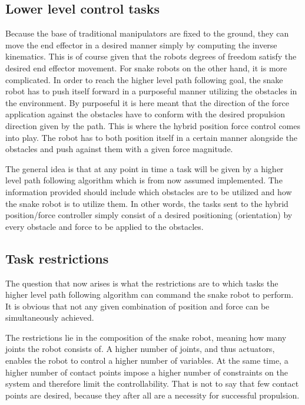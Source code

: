 \subsection{Lower level control tasks}

Because the base of traditional manipulators are fixed to the ground, they can move the end effector in a desired manner simply by computing the inverse kinematics. This is of course given that the robots degrees of freedom satisfy the desired end effector movement. For snake robots on the other hand, it is more complicated.
In order to reach the higher level path following goal, the snake robot has to push itself forward in a purposeful manner utilizing the obstacles in the environment. By purposeful it is here meant that the direction of the force application against the obstacles have to conform with the desired propulsion direction given by the path. This is where the hybrid position force control comes into play. The robot has to both position itself in a certain manner alongside the obstacles and push against them with a given force magnitude.

The general idea is that at any point in time a task will be given by a higher level path following algorithm which is from now assumed implemented. The information provided should include which obstacles are to be utilized and how the snake robot is to utilize them. In other words, the tasks sent to the hybrid position/force controller simply consist of a desired positioning (orientation) by every obstacle and force to be applied to the obstacles.



\subsection{Task restrictions}\label{subsec:task-restrictions}

The question that now arises is what the restrictions are to which tasks the higher level path following algorithm can command the snake robot to perform. It is obvious that not any given combination of position and force can be simultaneously achieved.

The restrictions lie in the composition of the snake robot, meaning how many joints the robot consists of. A higher number of joints, and thus actuators, enables the robot to control a higher number of variables. At the same time, a higher number of contact points impose a higher number of constraints on the system and therefore limit the controllability. That is not to say that few contact points are desired, because they after all are a necessity for successful propulsion.

